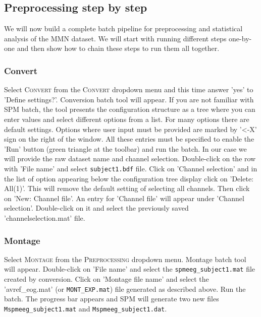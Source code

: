 \subsection{Preprocessing step by step}

We will now build a complete batch pipeline for preprocessing and statistical analysis of the MMN dataset. We will start with running different steps one-by-one and then show how to chain these steps to run them all together. 

\subsubsection{Convert}
Select \textsc{Convert} from the \textsc{Convert} dropdown menu and this time answer 'yes' to 'Define settings?'. Conversion batch tool will appear. If you are not familiar with SPM batch, the tool presents the configuration structure as a tree where you can enter values and select different options from a list. For many options there are default settings. Options where user input must be provided are marked by '<-X' sign on the right of the window. All these entries must be specified to enable the 'Run' button (green triangle at the toolbar) and run the batch. In our case we will provide the raw dataset name and channel selection. Double-click on the row with 'File name' and select \texttt{subject1.bdf} file. Click on 'Channel selection' and in the list of option appearing below the configuration tree display click on 'Delete: All(1)'. This will remove the default setting of selecting all channels. Then click on 'New: Channel file'. An entry for 'Channel file' will appear under 'Channel selection'. Double-click on it and select the previously saved 'channelselection.mat' file. 

\subsubsection{Montage}
Select \textsc{Montage} from the \textsc{Preprocessing} dropdown menu. Montage batch tool will appear. Double-click on 'File name' and select the \texttt{spmeeg\_subject1.mat} file created by conversion. Click on 'Montage file name' and select the  'avref_eog.mat' (or \texttt{MONT\_EXP.mat}) file generated as described above. Run the batch. The progress bar appears and SPM will generate two new files \texttt{Mspmeeg\_subject1.mat} and \texttt{Mspmeeg\_subject1.dat}.

